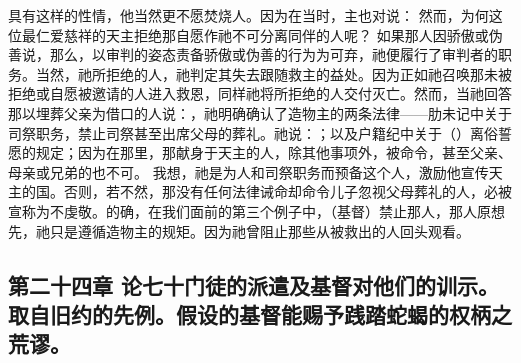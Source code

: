 具有这样的性情，他当然更不愿焚烧人。因为在当时，主也对说： 然而，为何这位最仁爱慈祥的天主拒绝那自愿作祂不可分离同伴的人呢？ 如果那人因骄傲或伪善说，那么，以审判的姿态责备骄傲或伪善的行为为可弃，祂便履行了审判者的职务。当然，祂所拒绝的人，祂判定其失去跟随救主的益处。因为正如祂召唤那未被拒绝或自愿被邀请的人进入救恩，同样祂将所拒绝的人交付灭亡。然而，当祂回答那以埋葬父亲为借口的人说：，祂明确确认了造物主的两条法律——肋未记中关于司祭职务，禁止司祭甚至出席父母的葬礼。祂说：；以及户籍纪中关于（）离俗誓愿的规定；因为在那里，那献身于天主的人，除其他事项外，被命令，甚至父亲、母亲或兄弟的也不可。 我想，祂是为人和司祭职务而预备这个人，激励他宣传天主的国。否则，若不然，那没有任何法律诫命却命令儿子忽视父母葬礼的人，必被宣称为不虔敬。的确，在我们面前的第三个例子中，（基督）禁止那人，那人原想先，祂只是遵循造物主的规矩。因为祂曾阻止那些从被救出的人回头观看。\par


\subsection{第二十四章 论七十门徒的派遣及基督对他们的训示。取自旧约的先例。假设的基督能赐予践踏蛇蝎的权柄之荒谬。}

